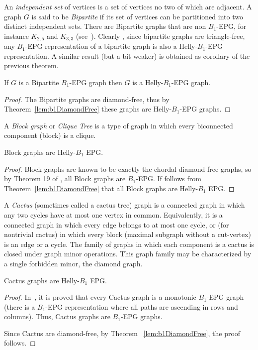 An \textit{independent set} of vertices is a set of vertices no two of which are adjacent.
A graph $G$ is said to be \textit{Bipartite} if its set of vertices can be partitioned into two distinct independent sets.
 There are Bipartite graphs that are non $B_1$-EPG, for instance $K_{2,5}$ and $K_{3,3}$ (see~\cite{cohen2014}). Clearly , since
 bipartite graphs are triangle-free, any $B_1$-EPG representation of a bipartite graph is also a Helly-$B_1$-EPG representation.
 A similar result (but a bit weaker) is obtained as corollary of the previous theorem. 


\begin{corollary}
If $G$ is a Bipartite $B_1$-EPG graph then $G$ is a Helly-$B_1$-EPG graph.
\end{corollary}

\begin{proof}
The Bipartite graphs are diamond-free, thus by Theorem~\ref{lem:b1DiamondFree} these graphs are Helly-$B_1$-EPG graphs.
\end{proof}

A \textit{Block graph} or \textit{Clique Tree} is a type of graph in which every biconnected component (block) is a clique.

\begin{corollary}\label{lem:cdf}
 Block graphs are Helly-$B_1$ EPG.
\end{corollary}

\begin{proof}
Block graphs are known to be exactly the chordal diamond-free graphs, so by   Theorem 19 of \cite{ries2009}, all Block graphs are  $B_1$-EPG. If follows from Theorem~\ref{lem:b1DiamondFree} that all Block graphs are Helly-$B_1$ EPG. 
 \end{proof} 

A \textit{Cactus} (sometimes called a cactus tree)  graph is a connected graph in which any two  cycles have at most one vertex in common. Equivalently, it is a connected graph in which every edge belongs to at most one  cycle, or (for nontrivial cactus) in which every block (maximal subgraph without a cut-vertex) is an edge or a cycle. The family of graphs in which each component is a cactus is closed under graph minor operations. This graph family may be characterized by a single forbidden minor, the diamond graph.
 
\begin{corollary}
Cactus graphs are  Helly-$B_1$ EPG.
\end{corollary}
\begin{proof}
In~\cite{cela2019monotonic}, it is proved that every Cactus graph is a monotonic $B_1$-EPG graph 
(there is a $B_1$-EPG representation where all paths are ascending in rows and columns). 
Thus, Cactus graphs are $B_1$-EPG graphs. 

Since Cactus are diamond-free, by Theorem ~\ref{lem:b1DiamondFree}, the proof follows.
\end{proof}

